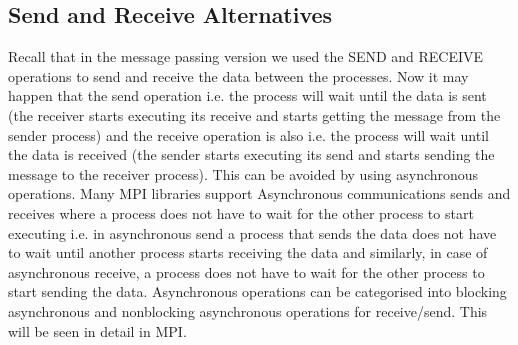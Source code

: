 \documentclass[12pt]{book}
\begin{document}
\subsection{Send and Receive Alternatives}
Recall that in the message passing version we used the SEND and RECEIVE operations to send and receive the data between the processes.
Now it may happen that the send operation i.e. the process will wait until the data is sent (the receiver starts executing its receive and starts getting the message from the sender process) 
and the receive operation is also i.e. the process will wait until the data is received (the sender starts executing its send and starts sending the message to the receiver process).
This can be avoided by using asynchronous operations. Many MPI libraries support Asynchronous communications sends and receives
where a process does not have to wait for the other process to start executing i.e. in asynchronous send a process that sends the data does not have to wait until another process starts receiving the data and similarly, in case of asynchronous receive,
a process does not have to wait for the other process to start sending the data. 
Asynchronous operations can be categorised into blocking asynchronous and nonblocking asynchronous operations for receive/send. This will be seen in detail in MPI.
\end{document}
